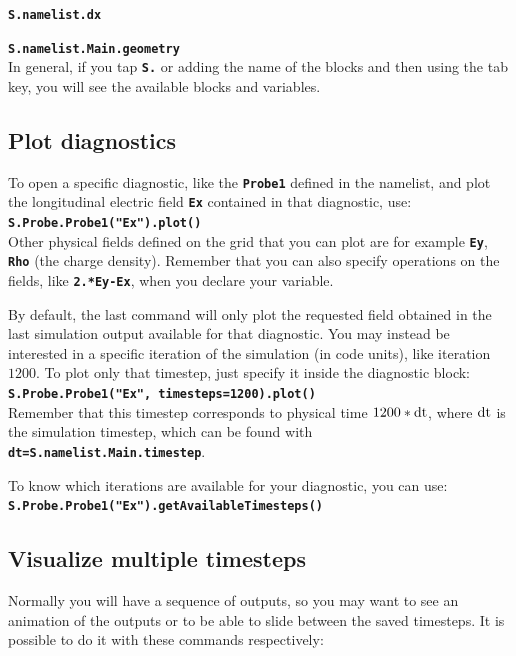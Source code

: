 \documentclass{article}
\newcommand{\commandline}[1]{\texttt{\textbf{#1}}}
\begin{document}
\commandline{S.namelist.dx}

\commandline{S.namelist.Main.geometry}\\

In general, if you tap \commandline{S.} or adding the name  of the blocks and then using the tab key, you will see the available blocks and variables.

\subsection*{Plot diagnostics}
To open a specific diagnostic, like the \commandline{Probe1} defined in the namelist, and plot the longitudinal electric field \commandline{Ex} contained in that diagnostic, use:\\

\commandline{S.Probe.Probe1("Ex").plot()}\\

Other physical fields defined on the grid that you can plot are for example  \commandline{Ey},  \commandline{Rho} (the charge density). Remember  that you can also specify operations on the fields, like \commandline{2.*Ey-Ex}, when you declare your variable.

By default, the last command will only plot the requested field obtained in the last simulation output available for that diagnostic. You may instead be interested in a specific iteration of the simulation (in code  units), like iteration $1200$. To plot only that timestep, just specify it inside the diagnostic block:\\

\commandline{S.Probe.Probe1("Ex", timesteps=1200).plot()}\\

Remember that this timestep corresponds to physical time $1200*\rm{dt}$, where $\rm{dt}$ is the simulation timestep,  which can be found with \commandline{dt=S.namelist.Main.timestep}.

To know which iterations are available for your diagnostic, you can use:\\

\commandline{S.Probe.Probe1("Ex").getAvailableTimesteps()}

\subsection*{Visualize multiple timesteps}
Normally you will have a sequence of outputs, so you may want to see an animation of the outputs or to be able to slide between the saved timesteps. It is possible to do it with these commands respectively:\\
\end{document}

